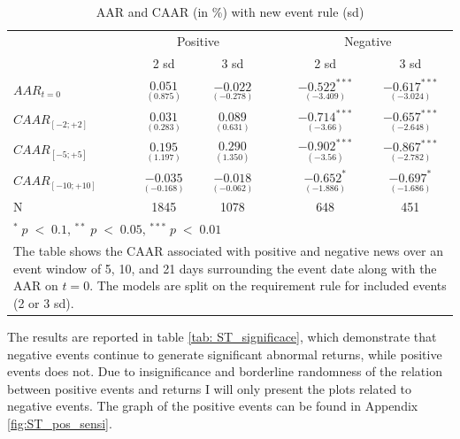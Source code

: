 \begin{table}[H]
\centering
\caption{AAR and CAAR (in \%) with new event rule (sd)} 
\begin{tabular}{lccccc}
  \hline  \hline
  & \multicolumn{2}{c}{Positive} &  & \multicolumn{2}{c}{Negative}\\ \cline{2-3} \cline{5-6}  
  & 2 sd & 3 sd & & 2 sd & 3 sd   \\   
 \hline
$AAR_{t=0}$ & $\underset{(0.875)}{0.051}$ & $\underset{(-0.278)}{-0.022}$ & & $\underset{(-3.409)}{-0.522^{***}}$ & $\underset{(-3.024)}{-0.617^{***}}$ \\ 
$CAAR_{[-2;+2]}$  & $\underset{(0.283)}{0.031}$  & $\underset{(0.631)}{0.089}$ & & $\underset{(-3.66)}{-0.714^{***}}$ & $\underset{(-2.648)}{-0.657^{***}}$ \\ 
$CAAR_{[-5;+5]}$  & $\underset{(1.197)}{0.195}$  & $\underset{(1.350)}{0.290}$ & &$\underset{(-3.56)}{-0.902^{***}}$ & $\underset{(-2.782)}{-0.867^{***}}$ \\ 
$CAAR_{[-10;+10]}$  & $\underset{(-0.168)}{-0.035}$  & $\underset{(-0.062)}{-0.018}$ &  & $\underset{(-1.886)}{-0.652^{*}}$ & $\underset{(-1.686)}{-0.697^{*}}$ \\ 
N & 1845 & 1078 & & 648 & 451  \\
   \hline \hline
   \multicolumn{6}{p{12cm}}{ \footnotesize $^* \; p\; <\; 0.1$, $ ^{**} \; p\; <\; 0.05$, $ ^{***} \; p\; <\; 0.01$  } \\
   \multicolumn{6}{p{13cm}}{\footnotesize The table shows the CAAR associated with positive and negative news over an event window of 5, 10, and 21 days surrounding the event date along with the AAR on $t=0$. The models are split on the requirement rule for included events (2 or 3 sd).} \\
   \hline
\end{tabular}
\label{tab:ST_sensitivity}
\end{table}


The results are reported in table \ref{tab: ST_significace}, which demonstrate that negative events continue to generate significant abnormal returns, while positive events does not. Due to insignificance and borderline randomness of the relation between positive events and returns I will only present the plots related to negative events. The graph of the positive events can be found in Appendix \ref{fig:ST_pos_sensi}. 


